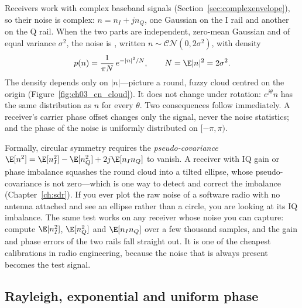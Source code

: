 Receivers work with complex baseband signals (Section~\ref{sec:complexenvelope}), so their noise is
complex: $n=n_I+jn_Q$, one Gaussian on the I rail and another on the Q rail. When the two parts are
independent, zero-mean Gaussian and of equal variance $\sigma^2$, the noise is , written $n\sim\mathcal{CN}(0,2\sigma^2)$, with density
\begin{equation}
p(n)=\frac{1}{\pi N}\,e^{-|n|^2/N},\qquad N=\E|n|^2=2\sigma^2 .
\label{eq:ch03:cn}
\end{equation}
The density depends only on $|n|$---picture a round, fuzzy cloud centred on the origin
(Figure~\ref{fig:ch03_cn_cloud}). It does not change under rotation: $e^{j\theta}n$ has the same
distribution as $n$ for every $\theta$. Two consequences follow immediately. A receiver's carrier
phase offset changes only the signal, never the noise statistics; and the phase of the noise is
uniformly distributed on $[-\pi,\pi)$.

Formally, circular symmetry requires the \emph{pseudo-covariance}
$\E[n^2]=\E[n_I^2]-\E[n_Q^2]+2j\E[n_In_Q]$ to vanish. A receiver with IQ gain or phase imbalance
squashes the round cloud into a tilted ellipse, whose pseudo-covariance is not zero---which is one
way to detect and correct the imbalance (Chapter~\ref{ch:sdr}). If you ever plot the raw noise of a
software radio with no antenna attached and see an ellipse rather than a circle, you are looking at
its IQ imbalance. The same test works on any receiver whose noise you can capture: compute
$\E[n_I^2]$, $\E[n_Q^2]$ and $\E[n_In_Q]$ over a few thousand samples, and the gain and phase errors
of the two rails fall straight out. It is one of the cheapest calibrations in radio engineering,
because the noise that is always present becomes the test signal.

\subsection{Rayleigh, exponential and uniform phase}

